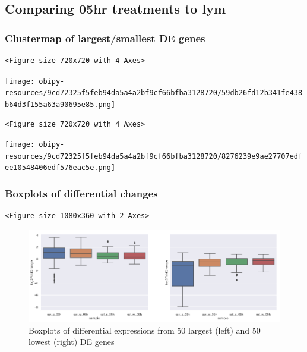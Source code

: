 \documentclass[a4paper]{article}
\begin{document}
\clearpage
\subsection{Comparing 05hr treatments to lym}
\label{sec:org7d44aa0}

\subsubsection{Clustermap of largest/smallest DE genes}
\label{sec:org6109b0f}
\begin{verbatim}
<Figure size 720x720 with 4 Axes>
\end{verbatim}

\begin{center}
\texttt{[image: obipy-resources/9cd72325f5feb94da5a4a2bf9cf66bfba3128720/59db26fd12b341fe438b64d3f155a63a90695e85.png]}
\end{center}

\begin{verbatim}
<Figure size 720x720 with 4 Axes>
\end{verbatim}

\begin{center}
\texttt{[image: obipy-resources/9cd72325f5feb94da5a4a2bf9cf66bfba3128720/8276239e9ae27707edfee10548406edf576eac5e.png]}
\end{center}

\subsubsection{Boxplots of differential changes}
\label{sec:org1965ec5}

\begin{verbatim}
<Figure size 1080x360 with 2 Axes>
\end{verbatim}

\begin{figure}[htbp]
\centering
\includegraphics[width=.9\linewidth]{obipy-resources/pairings_05hr_lym_boxplots.png}
\caption{\label{pairings_05hr_lym_boxplots}
Boxplots of differential expressions from 50 largest (left) and 50 lowest (right) DE genes}
\end{figure}
\end{document}
